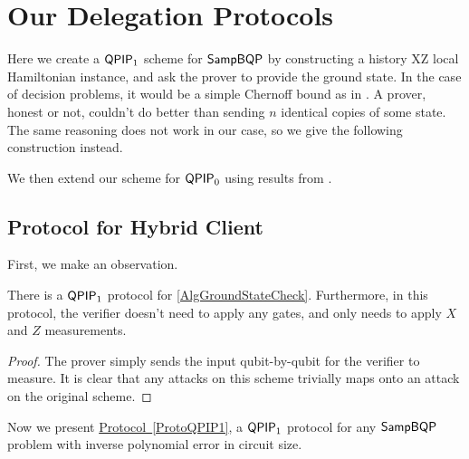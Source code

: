 \section{Our Delegation Protocols}

Here we create a $\operatorname{\mathsf{QPIP}}_1$ scheme for $\operatorname{\mathsf{SampBQP}}$ by constructing a history XZ local Hamiltonian instance, and ask the prover to provide the ground state. In the case of decision problems, it would be a simple Chernoff bound as in \cite{kitaev2002classical}. A prover, honest or not, couldn't do better than sending $n$ identical copies of some state. The same reasoning does not work in  our case, so  we give the following construction instead.

We then extend our scheme for $\operatorname{\mathsf{QPIP}}_0$ using results from \cite{mahadev_delegation}.

\subsection{Protocol for Hybrid Client}

First, we make an observation.

\begin{observation}
	\label{ProtoGroundStateCheck}
	There is a $\operatorname{\mathsf{QPIP}}_1$ protocol for \autoref{AlgGroundStateCheck}. Furthermore, in this protocol, the verifier doesn't need to apply any gates, and only needs to apply $X$ and $Z$ measurements.
\end{observation}
\begin{proof}
	The prover simply sends the input qubit-by-qubit for the verifier to measure. It is clear that any attacks on this scheme trivially maps onto an attack on the original scheme.
\end{proof}

Now we present \hyperref[ProtoQPIP1]{Protocol~\ref*{ProtoQPIP1}}, a $\operatorname{\mathsf{QPIP}}_1$ protocol for any $\operatorname{\mathsf{SampBQP}}$ problem with inverse polynomial error in circuit size.

